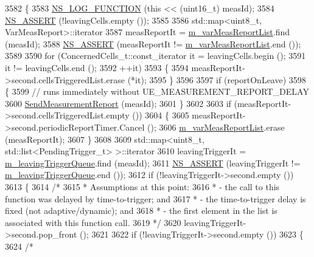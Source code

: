 \begin{DoxyCode}
3582 \{
3583   \hyperlink{log-macros-disabled_8h_a90b90d5bad1f39cb1b64923ea94c0761}{NS\_LOG\_FUNCTION} (\textcolor{keyword}{this} << (uint16\_t) measId);
3584   \hyperlink{assert_8h_a6dccdb0de9b252f60088ce281c49d052}{NS\_ASSERT} (!leavingCells.empty ());
3585 
3586   std::map<uint8\_t, VarMeasReport>::iterator
3587     measReportIt = \hyperlink{classns3_1_1LteUeRrc_a82da3c138c967761910c02b83724a0e4}{m\_varMeasReportList}.find (measId);
3588   \hyperlink{assert_8h_a6dccdb0de9b252f60088ce281c49d052}{NS\_ASSERT} (measReportIt != \hyperlink{classns3_1_1LteUeRrc_a82da3c138c967761910c02b83724a0e4}{m\_varMeasReportList}.end ());
3589 
3590   \textcolor{keywordflow}{for} (ConcernedCells\_t::const\_iterator it = leavingCells.begin ();
3591        it != leavingCells.end ();
3592        ++it)
3593     \{
3594       measReportIt->second.cellsTriggeredList.erase (*it);
3595     \}
3596 
3597   \textcolor{keywordflow}{if} (reportOnLeave)
3598     \{
3599       \textcolor{comment}{// runs immediately without UE\_MEASUREMENT\_REPORT\_DELAY}
3600       \hyperlink{classns3_1_1LteUeRrc_a053ea56e705de39c3531ec0a393c084d}{SendMeasurementReport} (measId);
3601     \}
3602 
3603   \textcolor{keywordflow}{if} (measReportIt->second.cellsTriggeredList.empty ())
3604     \{
3605       measReportIt->second.periodicReportTimer.Cancel ();
3606       \hyperlink{classns3_1_1LteUeRrc_a82da3c138c967761910c02b83724a0e4}{m\_varMeasReportList}.erase (measReportIt);
3607     \}
3608 
3609   std::map<uint8\_t, std::list<PendingTrigger\_t> >::iterator
3610     leavingTriggerIt = \hyperlink{classns3_1_1LteUeRrc_a7984d05cbcc51cd9239a22bd7e400d06}{m\_leavingTriggerQueue}.find (measId);
3611   \hyperlink{assert_8h_a6dccdb0de9b252f60088ce281c49d052}{NS\_ASSERT} (leavingTriggerIt != \hyperlink{classns3_1_1LteUeRrc_a7984d05cbcc51cd9239a22bd7e400d06}{m\_leavingTriggerQueue}.end ());
3612   \textcolor{keywordflow}{if} (!leavingTriggerIt->second.empty ())
3613     \{
3614       \textcolor{comment}{/*}
3615 \textcolor{comment}{       * Assumptions at this point:}
3616 \textcolor{comment}{       *  - the call to this function was delayed by time-to-trigger; and}
3617 \textcolor{comment}{       *  - the time-to-trigger delay is fixed (not adaptive/dynamic); and}
3618 \textcolor{comment}{       *  - the first element in the list is associated with this function call.}
3619 \textcolor{comment}{       */}
3620       leavingTriggerIt->second.pop\_front ();
3621 
3622       \textcolor{keywordflow}{if} (!leavingTriggerIt->second.empty ())
3623         \{
3624           \textcolor{comment}{/*}

\end{DoxyCode}
